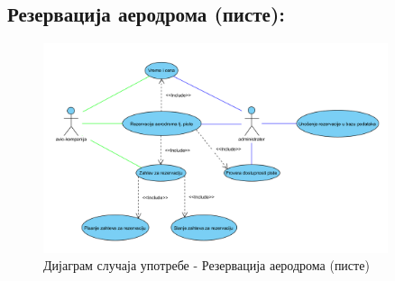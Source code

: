\documentclass{article}
\begin{document}
\subsection{Резервација аеродрома (писте):}

\begin{figure}[H]
    \centering
    \includegraphics[width=0.9\textwidth]{Dijagrami_slike/ucs_rezervacija_aerodroma.png}
    \caption{Дијаграм случаја употребе - Резервација аеродрома (писте)}
\end{figure}
\end{document}
